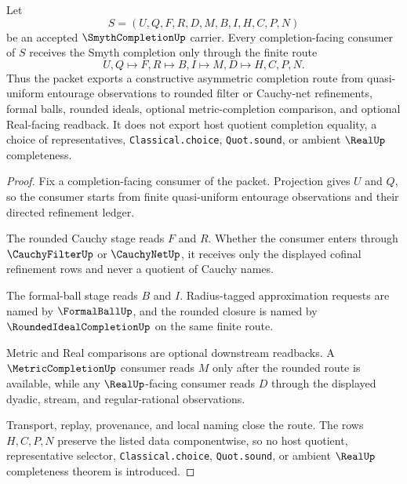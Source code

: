 \begin{theorem}
\label{thm:smyth-completion-finite-route}
Let
$$
S=(U,Q,F,R,D,M,B,I,H,C,P,N)
$$
be an accepted $\SmythCompletionUp$ carrier. Every completion-facing consumer of $S$ receives the Smyth completion only through the finite route
$$
U,Q \longmapsto F,R \longmapsto B,I \longmapsto M,D \longmapsto H,C,P,N .
$$
Thus the packet exports a constructive asymmetric completion route from quasi-uniform entourage observations to rounded filter or Cauchy-net refinements, formal balls, rounded ideals, optional metric-completion comparison, and optional Real-facing readback. It does not export host quotient completion equality, a choice of representatives, \texttt{Classical.choice}, \texttt{Quot.sound}, or ambient $\RealUp$ completeness.
\end{theorem}
\begin{proof}
Fix a completion-facing consumer of the packet. Projection gives $U$ and $Q$, so the consumer starts from finite quasi-uniform entourage observations and their directed refinement ledger.

The rounded Cauchy stage reads $F$ and $R$. Whether the consumer enters through $\CauchyFilterUp$ or $\CauchyNetUp$, it receives only the displayed cofinal refinement rows and never a quotient of Cauchy names.

The formal-ball stage reads $B$ and $I$. Radius-tagged approximation requests are named by $\FormalBallUp$, and the rounded closure is named by $\RoundedIdealCompletionUp$ on the same finite route.

Metric and Real comparisons are optional downstream readbacks. A $\MetricCompletionUp$ consumer reads $M$ only after the rounded route is available, while any $\RealUp$-facing consumer reads $D$ through the displayed dyadic, stream, and regular-rational observations.

Transport, replay, provenance, and local naming close the route. The rows $H,C,P,N$ preserve the listed data componentwise, so no host quotient, representative selector, \texttt{Classical.choice}, \texttt{Quot.sound}, or ambient $\RealUp$ completeness theorem is introduced.
\end{proof}


